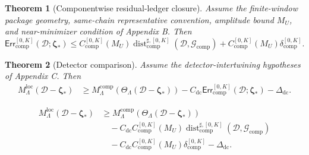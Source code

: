 \documentclass[10pt,a4paper]{amsart}
\newtheorem{theorem}{Theorem}
\newcommand{\Dist}{\operatorname{dist}}
\newcommand{\Err}{\mathsf{Err}}
\newcommand{\bzeta}{\boldsymbol\zeta}
\newcommand{\calD}{\mathcal D}
\newcommand{\calG}{\mathcal G}
\newcommand{\comp}{\mathrm{comp}}
\newcommand{\loc}{\mathrm{loc}}
\begin{document}
\begin{theorem}[Componentwise residual-ledger closure]\label{thm:main-ledger-module}
Assume the finite-window package geometry, same-chain representative convention, amplitude bound \(M_U\), and near-minimizer condition of Appendix B.  Then
\begin{equation}\label{eq:main-ledger-module}
        \Err_{\comp}^{[0,K]}(\calD;\bzeta_*)
        \le
        C_{\comp}^{[0,K]}(M_U)
        \Dist_{\comp}^{\sharp,[0,K]}(\calD,\calG_{\comp})
        +
        C_{\comp}^{[0,K]}(M_U)
        \delta_{\comp}^{[0,K]}.
\end{equation}
\end{theorem}

\begin{theorem}[Detector comparison]\label{thm:main-detector-module}
Assume the detector-intertwining hypotheses of Appendix C.  Then
\begin{equation}\label{eq:main-detector-module}
\begin{aligned}
        M_{\Lambda}^{\loc}(\calD-\bzeta_*)
        &\ge
        M_{\Lambda}^{\comp}(\Theta_{\Lambda}(\calD-\bzeta_*))
        -
        C_{\mathrm{dc}}
        \Err_{\comp}^{[0,K]}(\calD;\bzeta_*)
        -
        \Delta_{\mathrm{dc}}.
\end{aligned}
\end{equation}
\end{theorem}

\begin{equation}\label{eq:main-detector-after-ledger}
\begin{aligned}
        M_{\Lambda}^{\loc}(\calD-\bzeta_*)
        &\ge
        M_{\Lambda}^{\comp}(\Theta_{\Lambda}(\calD-\bzeta_*))\\
        &\quad
        -
        C_{\mathrm{dc}}C_{\comp}^{[0,K]}(M_U)
        \Dist_{\comp}^{\sharp,[0,K]}(\calD,\calG_{\comp})\\
        &\quad
        -
        C_{\mathrm{dc}}C_{\comp}^{[0,K]}(M_U)
        \delta_{\comp}^{[0,K]}
        -
        \Delta_{\mathrm{dc}}.
\end{aligned}
\end{equation}
\end{document}

